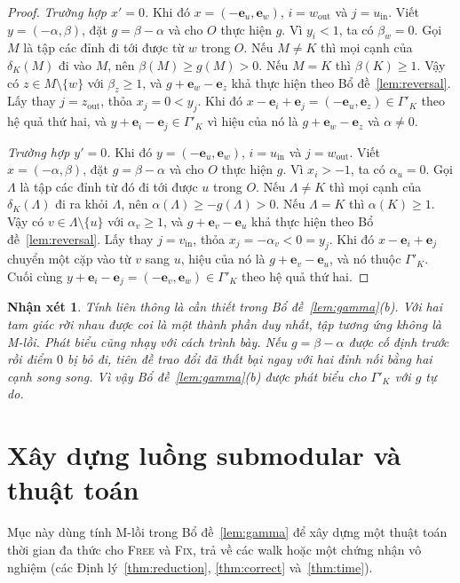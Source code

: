 \documentclass[pdflatex,sn-mathphys-num]{sn-jnl}
\theoremstyle{thmstyleone}%
\theoremstyle{thmstyletwo}%
\newtheorem{remark}{Nhận xét}%
\theoremstyle{thmstylethree}%
\newcommand{\e}{\mathbf{e}}
\newcommand{\out}{\mathrm{out}}
\newcommand{\inn}{\mathrm{in}}
\newcommand{\FIX}{\textup{\textsc{Fix}}}
\newcommand{\FREE}{\textup{\textsc{Free}}}
\begin{document}
\begin{proof}
\emph{Trường hợp $x'=0$.} Khi đó $x=(-\e_u,\e_w)$, $i=w_{\out}$ và $j=u_{\inn}$. Viết $y=(-\alpha,\beta)$, đặt $g=\beta-\alpha$ và cho $O$ thực hiện $g$. Vì $y_i<1$, ta có $\beta_w=0$. Gọi $M$ là tập các đỉnh đi tới được từ $w$ trong $O$. Nếu $M\ne K$ thì mọi cạnh của $\delta_K(M)$ đi vào $M$, nên $\beta(M)\ge g(M)>0$. Nếu $M=K$ thì $\beta(K)\ge1$. Vậy có $z\in M\setminus\{w\}$ với $\beta_z\ge1$, và $g+\e_w-\e_z$ khả thực hiện theo Bổ đề~\ref{lem:reversal}. Lấy thay $j=z_{\out}$, thỏa $x_j=0<y_j$. Khi đó $x-\e_i+\e_j=(-\e_u,\e_z)\in\Gamma'_K$ theo hệ quả thứ hai, và $y+\e_i-\e_j\in\Gamma'_K$ vì hiệu của nó là $g+\e_w-\e_z$ và $\alpha\ne0$.

\emph{Trường hợp $y'=0$.} Khi đó $y=(-\e_u,\e_w)$, $i=u_{\inn}$ và $j=w_{\out}$. Viết $x=(-\alpha,\beta)$, đặt $g=\beta-\alpha$ và cho $O$ thực hiện $g$. Vì $x_i>-1$, ta có $\alpha_u=0$. Gọi $\Lambda$ là tập các đỉnh từ đó đi tới được $u$ trong $O$. Nếu $\Lambda\ne K$ thì mọi cạnh của $\delta_K(\Lambda)$ đi ra khỏi $\Lambda$, nên $\alpha(\Lambda)\ge-g(\Lambda)>0$. Nếu $\Lambda=K$ thì $\alpha(K)\ge1$. Vậy có $v\in\Lambda\setminus\{u\}$ với $\alpha_v\ge1$, và $g+\e_v-\e_u$ khả thực hiện theo Bổ đề~\ref{lem:reversal}. Lấy thay $j=v_{\inn}$, thỏa $x_j=-\alpha_v<0=y_j$. Khi đó $x-\e_i+\e_j$ chuyển một cặp vào từ $v$ sang $u$, hiệu của nó là $g+\e_v-\e_u$, và nó thuộc $\Gamma'_K$. Cuối cùng $y+\e_i-\e_j=(-\e_v,\e_w)\in\Gamma'_K$ theo hệ quả thứ hai.
\end{proof}

\begin{remark}\label{rem:connected}
Tính liên thông là cần thiết trong Bổ đề~\ref{lem:gamma}(b). Với hai tam giác rời nhau được coi là một thành phần duy nhất, tập tương ứng không là M-lồi. Phát biểu cũng nhạy với cách trình bày. Nếu $g=\beta-\alpha$ được cố định trước rồi điểm $0$ bị bỏ đi, tiên đề trao đổi đã thất bại ngay với hai đỉnh nối bằng hai cạnh song song. Vì vậy Bổ đề~\ref{lem:gamma}(b) được phát biểu cho $\Gamma'_K$ với $g$ tự do.
\end{remark}

\section{Xây dựng luồng submodular và thuật toán}\label{sec:method}

Mục này dùng tính M-lồi trong Bổ đề~\ref{lem:gamma} để xây dựng một thuật toán thời gian đa thức cho \FREE{} và \FIX{}, trả về các walk hoặc một chứng nhận vô nghiệm (các Định lý~\ref{thm:reduction}, \ref{thm:correct} và~\ref{thm:time}).
\end{document}
